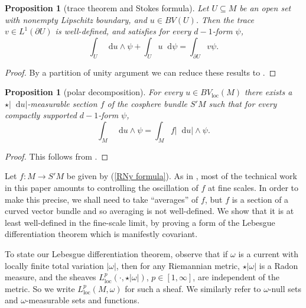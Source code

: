 \documentclass[reqno,11pt]{amsart}
\newcommand*\dif{\mathop{}\!\mathrm{d}}
\newcommand{\vol}{\mathrm{vol}}
\newcommand{\loc}{\mathrm{loc}}
\newtheorem{proposition}[theorem]{Proposition}
\theoremstyle{definition}
\numberwithin{equation}{section}
\begin{document}
\begin{proposition}[trace theorem and Stokes formula]
Let $U \subseteq M$ be an open set with nonempty Lipschitz boundary, and $u \in BV(U)$.
Then the trace $v \in L^1(\partial U)$ is well-defined,
and satisfies for every $d - 1$-form $\psi$,
\begin{equation}\label{Miranda IBP}
\int_U \dif u \wedge \psi + \int_U u \dif \psi = \int_{\partial U} v\psi.
\end{equation}
\end{proposition}
\begin{proof}
By a partition of unity argument we can reduce these results to \cite[Teorema 1]{Miranda67}.
\end{proof}

\begin{proposition}[polar decomposition]
For every $u \in BV_\loc(M)$ there exists a $\star |\dif u|$-measurable section $f$ of the cosphere bundle $S'M$ such that for every compactly supported $d-1$-form $\psi$,
\begin{equation}\label{RNy formula}
\int_M \dif u \wedge \psi = \int_M f|\dif u| \wedge \psi.
\end{equation}
\end{proposition}
\begin{proof}
This follows from \cite[Theorem 4.14]{simon1983GMT}.
\end{proof}

Let $f: M \to S'M$ be given by (\ref{RNy formula}).
As in \cite{Miranda66, Giusti77}, most of the technical work in this paper amounts to controlling the oscillation of $f$ at fine scales.
In order to make this precise, we shall need to take ``averages'' of $f$, but $f$ is a section of a curved vector bundle and so averaging is not well-defined.
We show that it is at least well-defined in the fine-scale limit, by proving a form of the Lebesgue differentiation theorem which is manifestly covariant.

To state our Lebesgue differentiation theorem, observe that if $\omega$ is a current with locally finite total variation $|\omega|$, then for any Riemannian metric, $\star|\omega|$ is a Radon measure, and the sheaves $L^p_\loc(\cdot, \star |\omega|)$, $p \in [1, \infty]$, are independent of the metric.
So we write $L^p_\loc(M, \omega)$ for such a sheaf.
We similarly refer to $\omega$-null sets and $\omega$-measurable sets and functions.
\end{document}
